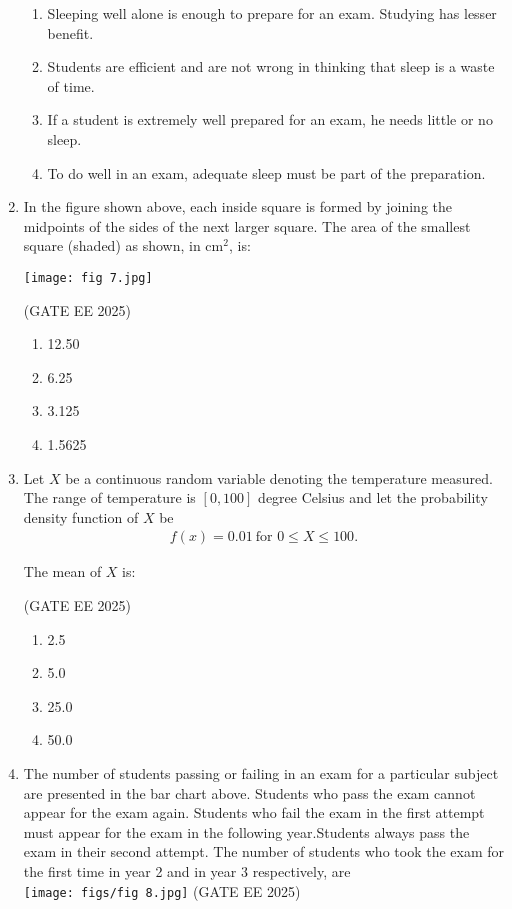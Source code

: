 \documentclass[journal,12pt,onecolumn]{IEEEtran}
\theoremstyle{remark}
\begin{document}
\begin{enumerate}
\begin{enumerate}
\item Sleeping well alone is enough to prepare for an exam. Studying has lesser benefit.
\item Students are efficient and are not wrong in thinking that sleep is a waste of time.
\item If a student is extremely well prepared for an exam, he needs little or no sleep.
\item To do well in an exam, adequate sleep must be part of the preparation.
\end{enumerate}

\item In the figure shown above, each inside square is formed by joining the midpoints of the sides of the next larger square. The area of the smallest square (shaded) as shown, in cm$^2$, is:  

    \texttt{[image: fig 7.jpg]}

\hfill(GATE EE 2025)

\begin{multicols}{4}
\begin{enumerate}
\item 12.50
\item 6.25
\item 3.125
\item 1.5625
\end{enumerate}
\end{multicols}

\item Let $X$ be a continuous random variable denoting the temperature measured. 
The range of temperature is $[0,100]$ degree Celsius and let the probability density function of $X$ be \begin{align*}
 f(x) = 0.01 \ \text{for } 0 \leq X \leq 100.     
\end{align*} 

The mean of $X$ is:

\hfill(GATE EE 2025)

\begin{multicols}{4}
\begin{enumerate}
\item 2.5
\item 5.0
\item 25.0
\item 50.0
\end{enumerate}
\end{multicols}

\item The number of students passing or failing in an exam for a particular subject are presented in the bar chart above. 
Students who pass the exam cannot appear for the exam again. Students who fail the exam in the first attempt must appear for the exam in the following year.Students always pass the exam in their second attempt. The number of students who took the exam for the first time in year 2 and in year 3 respectively, are \underline{\hspace{2cm}}\\
 \texttt{[image: figs/fig 8.jpg]}
\hfill(GATE EE 2025)


\end{enumerate}
\end{document}
